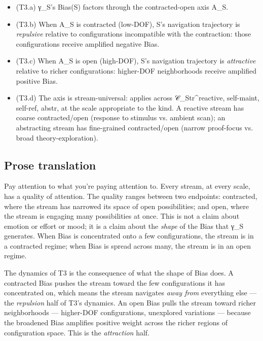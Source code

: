 \documentclass[11pt, openany]{book}
\begin{document}
\begin{itemize}
\item (T3.a) γ\_\allowbreak{}S's Bias(S) factors through the contracted-open axis A\_\allowbreak{}S.
\item (T3.b) When A\_\allowbreak{}S is contracted (low-DOF), S's navigation trajectory is \textit{repulsive} relative to configurations incompatible with the contraction: those configurations receive amplified negative Bias.
\item (T3.c) When A\_\allowbreak{}S is open (high-DOF), S's navigation trajectory is \textit{attractive} relative to richer configurations: higher-DOF neighborhoods receive amplified positive Bias.
\item (T3.d) The axis is stream-universal: applies across 𝒞\_\allowbreak{}Str\textasciicircum{}reactive, self-maint, self-ref, abstr, at the scale appropriate to the kind. A reactive stream has coarse contracted/open (response to stimulus vs. ambient scan); an abstracting stream has fine-grained contracted/open (narrow proof-focus vs. broad theory-exploration).
\end{itemize}

\subsection{Prose translation}

Pay attention to what you're paying attention to. Every stream, at every scale, has a quality of attention. The quality ranges between two endpoints: contracted, where the stream has narrowed its space of open possibilities; and open, where the stream is engaging many possibilities at once. This is not a claim about emotion or effort or mood; it is a claim about the \textit{shape} of the Bias that γ\_\allowbreak{}S generates. When Bias is concentrated onto a few configurations, the stream is in a contracted regime; when Bias is spread across many, the stream is in an open regime.

The dynamics of T3 is the consequence of what the shape of Bias does. A contracted Bias pushes the stream toward the few configurations it has concentrated on, which means the stream navigates \textit{away from} everything else --- the \textit{repulsion} half of T3's dynamics. An open Bias pulls the stream toward richer neighborhoods --- higher-DOF configurations, unexplored variations --- because the broadened Bias amplifies positive weight across the richer regions of configuration space. This is the \textit{attraction} half.
\end{document}
